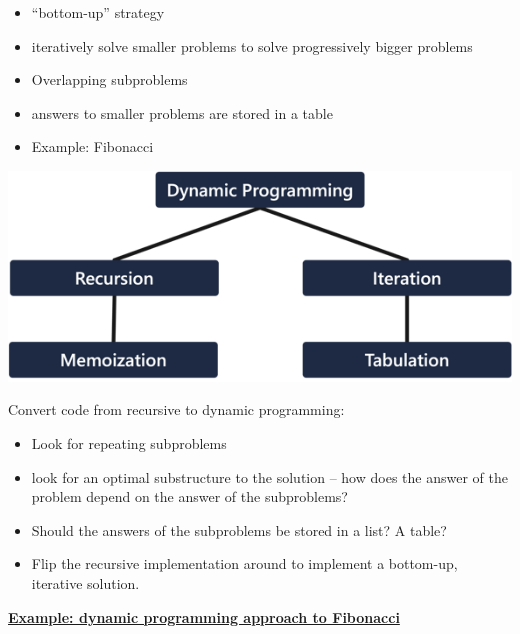\begin{itemize}
    \item “bottom-up” strategy
    \item iteratively solve smaller problems to solve progressively bigger problems
    \item Overlapping subproblems
    \item answers to smaller problems are stored in a table
    \item Example: Fibonacci
\end{itemize}

\includegraphics[width = \linewidth]{src/7_dp/images/dp.png}

Convert code from recursive to dynamic programming:
\begin{itemize}
    \item Look for repeating subproblems
    \item look for an optimal substructure to the solution – how does the answer of the problem depend on the answer of the subproblems?
    \item Should the answers of the subproblems be stored in a list? A table?
    \item Flip the recursive implementation around to implement a bottom-up, iterative solution.
\end{itemize}

{\centering \underline{\textbf{Example: dynamic programming approach to Fibonacci}} \par}

